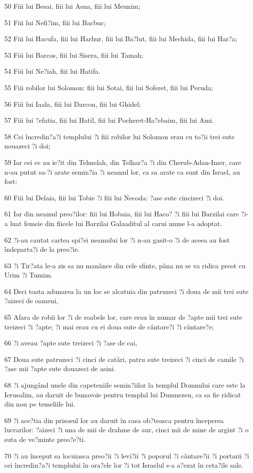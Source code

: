 \par 50 Fiii lui Besai, fiii lui Asna, fiii lui Meunim;
\par 51 Fiii lui Nefi?im, fiii lui Bacbuc;
\par 52 Fiii lui Hacufa, fiii lui Harhur, fiii lui Ba?lut, fiii lui Mechida, fiii lui Har?a;
\par 53 Fiii lui Barcos, fiii lui Sisera, fiii lui Tamah;
\par 54 Fiii lui Ne?iah, fiii lui Hatifa.
\par 55 Fiii robilor lui Solomon: fiii lui Sotai, fiii lui Soferet, fiii lui Peruda;
\par 56 Fiii lui Iaala, fiii lui Darcon, fiii lui Ghidel;
\par 57 Fiii lui ?efatia, fiii lui Hatil, fiii lui Pocheret-Ha?ebaim, fiii lui Ami.
\par 58 Cei încredin?a?i templului ?i fiii robilor lui Solomon erau cu to?ii trei sute nouazeci ?i doi;
\par 59 Iar cei ce au ie?it din Telmelah, din Telhar?a ?i din Cherub-Adan-Imer, care n-au putut sa-?i arate semin?ia ?i neamul lor, ca sa arate ca sunt din Israel, au fost:
\par 60 Fiii lui Delaia, fiii lui Tobie ?i fiii lui Necoda: ?ase sute cincizeci ?i doi.
\par 61 Iar din neamul preo?ilor: fiii lui Hobaia, fiii lui Haco? ?i fiii lui Barzilai care ?i-a luat femeie din fiicele lui Barzilai Galaaditul al carui nume l-a adoptat.
\par 62 ?i-au cautat cartea spi?ei neamului lor ?i n-au gasit-o ?i de aceea au fost îndeparta?i de la preo?ie.
\par 63 ?i Tir?ata le-a zis sa nu manânce din cele sfinte, pâna nu se va ridica preot cu Urim ?i Tumim.
\par 64 Deci toata adunarea la un loc se alcatuia din patruzeci ?i doua de mii trei sute ?aizeci de oameni,
\par 65 Afara de robii lor ?i de roabele lor, care erau în numar de ?apte mii trei sute treizeci ?i ?apte; ?i mai erau cu ei doua sute de cântare?i ?i cântare?e;
\par 66 ?i aveau ?apte sute treizeci ?i ?ase de cai,
\par 67 Doua sute patruzeci ?i cinci de catâri, patru sute treizeci ?i cinci de camile ?i ?ase mii ?apte sute douazeci de asini.
\par 68 ?i ajungând unele din capeteniile semin?iilor la templul Domnului care este la Ierusalim, au daruit de bunavoie pentru templul lui Dumnezeu, ca sa fie ridicat din nou pe temeliile lui.
\par 69 ?i ace?tia din prisosul lor au daruit în casa ob?teasca pentru începerea lucrarilor: ?aizeci ?i una de mii de drahme de aur, cinci mii de mine de argint ?i o suta de ve?minte preo?e?ti.
\par 70 ?i au început sa locuiasca preo?ii ?i levi?ii ?i poporul ?i cântare?ii ?i portarii ?i cei încredin?a?i templului în ora?ele lor ?i tot Israelul s-a a?ezat în ceta?ile sale.

